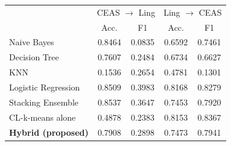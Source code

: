 \begin{tabular}{lcccc}
\toprule
 & \multicolumn{2}{c}{CEAS $\rightarrow$ Ling} & \multicolumn{2}{c}{Ling $\rightarrow$ CEAS}\\
 & Acc. & F1 & Acc. & F1\\
\midrule
Naive Bayes & 0.8464 & 0.0835 & 0.6592 & 0.7461\\
Decision Tree & 0.7607 & 0.2484 & 0.6734 & 0.6627\\
KNN & 0.1536 & 0.2654 & 0.4781 & 0.1301\\
Logistic Regression & 0.8509 & 0.3983 & 0.8168 & 0.8279\\
Stacking Ensemble & 0.8537 & 0.3647 & 0.7453 & 0.7920\\
CL-k-means alone & 0.4878 & 0.2383 & 0.8153 & 0.8367\\
\textbf{Hybrid (proposed)} & 0.7908 & 0.2898 & 0.7473 & 0.7941\\
\bottomrule
\end{tabular}
